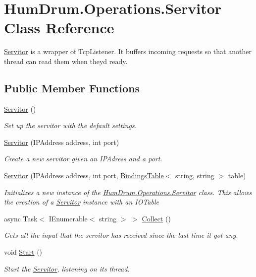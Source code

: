 \hypertarget{classHumDrum_1_1Operations_1_1Servitor}{}\section{Hum\+Drum.\+Operations.\+Servitor Class Reference}
\label{classHumDrum_1_1Operations_1_1Servitor}


\hyperlink{classHumDrum_1_1Operations_1_1Servitor}{Servitor} is a wrapper of Tcp\+Listener. It buffers incoming requests so that another thread can read them when they\textquotesingle{}d ready.  


\subsection*{Public Member Functions}
\begin{DoxyCompactItemize}
\item 
\hyperlink{classHumDrum_1_1Operations_1_1Servitor_a3da58c881e82de9be18014a186e115f5}{Servitor} ()
\begin{DoxyCompactList}\small\item\em Set up the servitor with the default settings. \end{DoxyCompactList}\item 
\hyperlink{classHumDrum_1_1Operations_1_1Servitor_ac77fd091ee638a61e42fa013c7a330ff}{Servitor} (I\+P\+Address address, int port)
\begin{DoxyCompactList}\small\item\em Create a new servitor given an I\+P\+Adress and a port. \end{DoxyCompactList}\item 
\hyperlink{classHumDrum_1_1Operations_1_1Servitor_aed529778829ebe0befe5da40f403470c}{Servitor} (I\+P\+Address address, int port, \hyperlink{classHumDrum_1_1Structures_1_1BindingsTable}{Bindings\+Table}$<$ string, string $>$ table)
\begin{DoxyCompactList}\small\item\em Initializes a new instance of the \hyperlink{classHumDrum_1_1Operations_1_1Servitor}{Hum\+Drum.\+Operations.\+Servitor} class. This allows the creation of a \hyperlink{classHumDrum_1_1Operations_1_1Servitor}{Servitor} instance with an I\+O\+Table \end{DoxyCompactList}\item 
async Task$<$ I\+Enumerable$<$ string $>$ $>$ \hyperlink{classHumDrum_1_1Operations_1_1Servitor_a3565d07ac8c4b4cde722f4dcc6f629ff}{Collect} ()
\begin{DoxyCompactList}\small\item\em Gets all the input that the servitor has received since the last time it got any. \end{DoxyCompactList}\item 
void \hyperlink{classHumDrum_1_1Operations_1_1Servitor_a6b5653f2dc424b576a6cfdf9bfe3f021}{Start} ()
\begin{DoxyCompactList}\small\item\em Start the \hyperlink{classHumDrum_1_1Operations_1_1Servitor}{Servitor}, listening on its thread. \end{DoxyCompactList}\end{DoxyCompactItemize}
